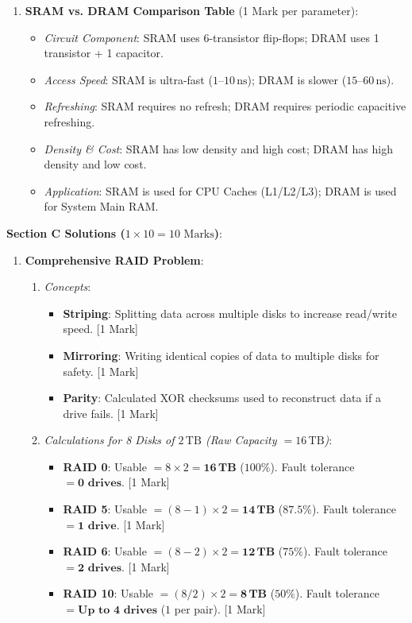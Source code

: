 \begin{solutionbox}
\begin{enumerate}[start=6]
    \item \textbf{SRAM vs. DRAM Comparison Table} (1 Mark per parameter):
    \begin{itemize}
        \item \textit{Circuit Component}: SRAM uses 6-transistor flip-flops; DRAM uses 1 transistor + 1 capacitor.
        \item \textit{Access Speed}: SRAM is ultra-fast ($1\text{--}10\,\text{ns}$); DRAM is slower ($15\text{--}60\,\text{ns}$).
        \item \textit{Refreshing}: SRAM requires no refresh; DRAM requires periodic capacitive refreshing.
        \item \textit{Density \& Cost}: SRAM has low density and high cost; DRAM has high density and low cost.
        \item \textit{Application}: SRAM is used for CPU Caches (L1/L2/L3); DRAM is used for System Main RAM.
    \end{itemize}
\end{enumerate}

\medskip
\noindent\textbf{Section C Solutions ($1 \times 10 = 10\text{ Marks}$)}:
\begin{enumerate}[start=8]
    \item \textbf{Comprehensive RAID Problem}:
    \begin{enumerate}[label=(\alph*)]
        \item \textit{Concepts}:
        \begin{itemize}
            \item \textbf{Striping}: Splitting data across multiple disks to increase read/write speed. [1 Mark]
            \item \textbf{Mirroring}: Writing identical copies of data to multiple disks for safety. [1 Mark]
            \item \textbf{Parity}: Calculated XOR checksums used to reconstruct data if a drive fails. [1 Mark]
        \end{itemize}
        
        \item \textit{Calculations for 8 Disks of $2\,\text{TB}$ (Raw Capacity $= 16\,\text{TB}$)}:
        \begin{itemize}
            \item \textbf{RAID 0}: Usable $= 8 \times 2 = \mathbf{16\,\text{TB}}$ ($100\%$). Fault tolerance $= \mathbf{0\text{ drives}}$. [1 Mark]
            \item \textbf{RAID 5}: Usable $= (8 - 1) \times 2 = \mathbf{14\,\text{TB}}$ ($87.5\%$). Fault tolerance $= \mathbf{1\text{ drive}}$. [1 Mark]
            \item \textbf{RAID 6}: Usable $= (8 - 2) \times 2 = \mathbf{12\,\text{TB}}$ ($75\%$). Fault tolerance $= \mathbf{2\text{ drives}}$. [1 Mark]
            \item \textbf{RAID 10}: Usable $= (8 / 2) \times 2 = \mathbf{8\,\text{TB}}$ ($50\%$). Fault tolerance $= \mathbf{\text{Up to } 4\text{ drives}}$ ($1$ per pair). [1 Mark]
        \end{itemize}
        

\end{enumerate}
\end{enumerate}
\end{solutionbox}
